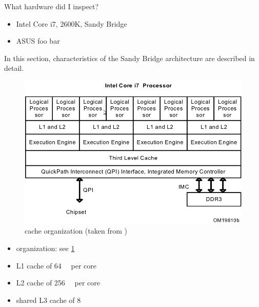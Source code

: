 \label{sec:technical-prerequisites}

What hardware did I inspect?

\label{sec:hw-products}

\begin{itemize}

\item Intel Core i7, 2600K, Sandy Bridge

\item ASUS foo bar

\end{itemize}


\label{sec:sandy-bridge}

In this section, characteristics of the Sandy Bridge architecture are described
in detail.

\begin{figure}
  \centering
    \includegraphics[width=\textwidth]{fig/intel-cache-orga.png}
  \caption{\JWPcpu cache organization (taken from \cite{intel2011softdev})}
  \label{fig:cache-orga}
\end{figure}



\begin{itemize}

\item organization: see \ref{fig:cache-orga}

\item L1 cache of \SI{64}{\kibi\byte} per core\cite{intel2011softdev}

\item L2 cache of \SI{256}{\kibi\byte} per core\cite{intel2011softdev}

\item shared L3 cache of \SI{8}{\mebi\byte}\cite{intel2011softdev}

\end{itemize}


